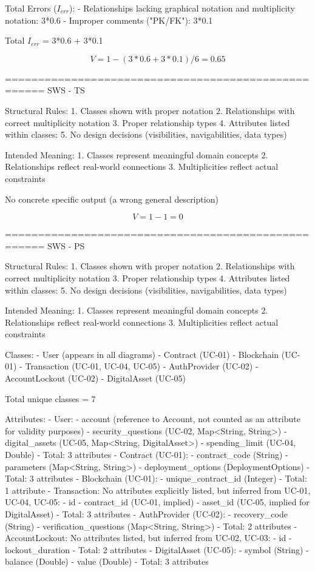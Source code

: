 Total Errors (\( I_{err} \)):
- Relationships lacking graphical notation and multiplicity notation: 3*0.6
- Improper comments ("PK/FK"): 3*0.1

Total \( I_{err} \) = 3*0.6 + 3*0.1

\[
V = 1 - (3*0.6 + 3*0.1)/6 = 0.65
\]

====================================================
SWS - TS

Structural Rules:
1. Classes shown with proper notation
2. Relationships with correct multiplicity notation
3. Proper relationship types
4. Attributes listed within classes: 
5. No design decisions (visibilities, navigabilities, data types)

Intended Meaning:
1. Classes represent meaningful domain concepts
2. Relationships reflect real-world connections
3. Multiplicities reflect actual constraints

No concrete specific output (a wrong general description) 

\[
V = 1 - 1 = 0
\]

====================================================
SWS - PS

Structural Rules:
1. Classes shown with proper notation
2. Relationships with correct multiplicity notation
3. Proper relationship types
4. Attributes listed within classes: 
5. No design decisions (visibilities, navigabilities, data types)

Intended Meaning:
1. Classes represent meaningful domain concepts
2. Relationships reflect real-world connections
3. Multiplicities reflect actual constraints

Classes:
- User (appears in all diagrams)
- Contract (UC-01)
- Blockchain (UC-01)
- Transaction (UC-01, UC-04, UC-05)
- AuthProvider (UC-02)
- AccountLockout (UC-02)
- DigitalAsset (UC-05)

Total unique classes = 7

Attributes:
- User:
- account (reference to Account, not counted as an attribute for validity purposes)
- security_questions (UC-02, Map<String, String>)
- digital_assets (UC-05, Map<String, DigitalAsset>)
- spending_limit (UC-04, Double)
- Total: 3 attributes
- Contract (UC-01):
- contract_code (String)
- parameters (Map<String, String>)
- deployment_options (DeploymentOptions)
- Total: 3 attributes
- Blockchain (UC-01):
- unique_contract_id (Integer)
- Total: 1 attribute
- Transaction: No attributes explicitly listed, but inferred from UC-01, UC-04, UC-05:
- id
- contract_id (UC-01, implied)
- asset_id (UC-05, implied for DigitalAsset)
- Total: 3 attributes
- AuthProvider (UC-02):
- recovery_code (String)
- verification_questions (Map<String, String>)
- Total: 2 attributes
- AccountLockout: No attributes listed, but inferred from UC-02, UC-03:
- id
- lockout_duration
- Total: 2 attributes
- DigitalAsset (UC-05):
- symbol (String)
- balance (Double)
- value (Double)
- Total: 3 attributes

